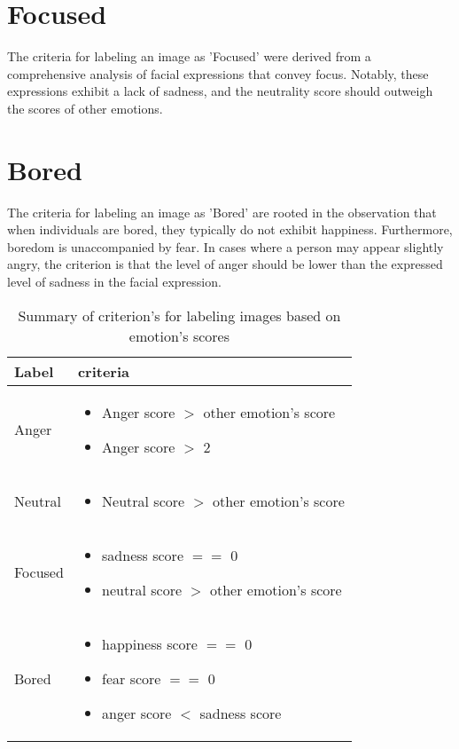 \documentclass[]{report}
\begin{document}
\section{Focused}
The criteria for labeling an image as 'Focused' were derived from a comprehensive analysis of facial expressions that convey focus. Notably, these expressions exhibit a lack of sadness, and the neutrality score should outweigh the scores of other emotions.

\section{Bored}
The criteria for labeling an image as 'Bored' are rooted in the observation that when individuals are bored, they typically do not exhibit happiness. Furthermore, boredom is unaccompanied by fear. In cases where a person may appear slightly angry, the criterion is that the level of anger should be lower than the expressed level of sadness in the facial expression.


\begin{table}[h]
	\centering
	\caption{Summary of criterion's for labeling images based on emotion's scores}
	\begin{tabular}{|m{2cm}|m{8cm}|}
		\hline
		Label & criteria \\ \hline
		Anger & \begin{itemize}
			\item Anger score $>$ other emotion's score
			\item Anger score $>$ 2
		\end{itemize} \\ \hline
		Neutral & \begin{itemize}
			\item Neutral score $>$ other emotion's score
		\end{itemize} \\ \hline
		Focused & \begin{itemize}
			\item sadness score $==$ 0
			\item neutral score $>$ other emotion's score
		\end{itemize} \\ \hline
		Bored & \begin{itemize}
			\item happiness score $==$ 0
			\item fear score $==$ 0
			\item anger score $<$ sadness score
		\end{itemize} \\ \hline
	\end{tabular}
\end{table}
\end{document}
